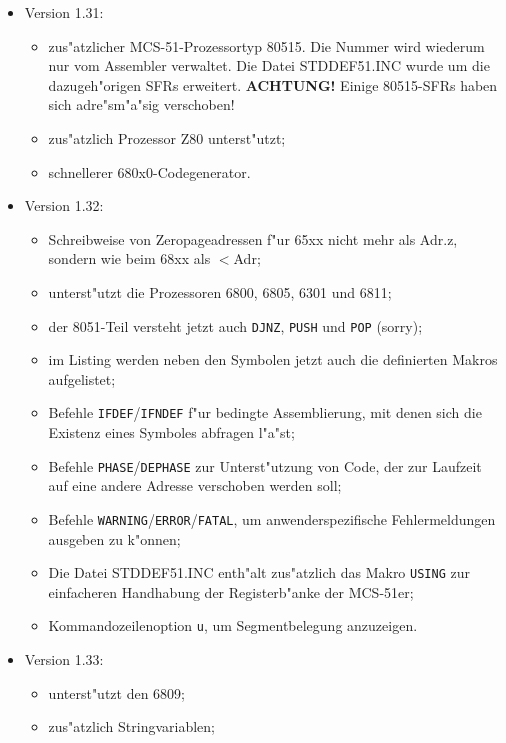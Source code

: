 \documentclass[12pt,a4paper,twoside]{report}
\newcommand{\bb}[1]{{\bf #1}}
\newcommand{\tty}[1]{{\tt #1}}
\begin{document}
{\begin{itemize}
\item{Version 1.31:
      \begin{itemize}
      \item{zus"atzlicher MCS-51-Prozessortyp 80515.  Die Nummer wird
            wiederum nur vom Assembler verwaltet.  Die Datei STDDEF51.INC
            wurde um die dazugeh"origen SFRs erweitert. \bb{ACHTUNG!}
            Einige 80515-SFRs haben sich adre"sm"a"sig verschoben!}
      \item{zus"atzlich Prozessor Z80 unterst"utzt;}
      \item{schnellerer 680x0-Codegenerator.}
      \end{itemize}}
\item{Version 1.32:
      \begin{itemize}
      \item{Schreibweise von Zeropageadressen f"ur 65xx nicht mehr als
            Adr.z, sondern wie beim 68xx als $<$Adr;}
      \item{unterst"utzt die Prozessoren 6800, 6805, 6301 und 6811;}
      \item{der 8051-Teil versteht jetzt auch \tty{DJNZ}, \tty{PUSH} und
            \tty{POP} (sorry);}
      \item{im Listing werden neben den Symbolen jetzt auch die definierten
            Makros aufgelistet;}
      \item{Befehle \tty{IFDEF}/\tty{IFNDEF} f"ur bedingte Assemblierung,
            mit denen sich die Existenz eines Symboles abfragen l"a"st;}
      \item{Befehle \tty{PHASE}/\tty{DEPHASE} zur Unterst"utzung von Code, der zur
            Laufzeit auf eine andere Adresse verschoben werden soll;}
      \item{Befehle \tty{WARNING}/\tty{ERROR}/\tty{FATAL}, um anwenderspezifische
            Fehlermeldungen ausgeben zu k"onnen;}
      \item{Die Datei STDDEF51.INC enth"alt zus"atzlich das Makro \tty{USING}
            zur einfacheren Handhabung der Registerb"anke der MCS-51er;}
      \item{Kommandozeilenoption \tty{u}, um Segmentbelegung anzuzeigen.}
      \end{itemize}}
\item{Version 1.33:
      \begin{itemize}
      \item{unterst"utzt den 6809;}
      \item{zus"atzlich Stringvariablen;}

\end{itemize}}
\end{itemize}}
\end{document}
